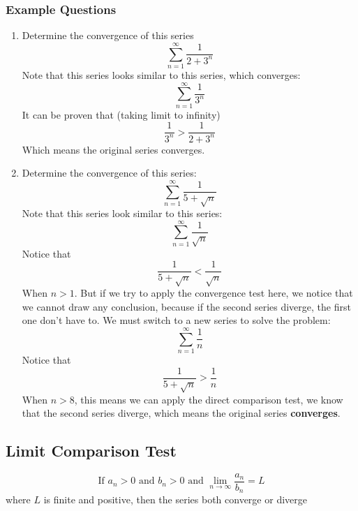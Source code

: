 \documentclass{article}
\numberwithin{equation}{section}
\begin{document}
\subsubsection{Example Questions}
\begin{enumerate}
    \item Determine the convergence of this series
    \[
        \sum_{n = 1}^{\infty} \frac{1}{2 + 3^n}
    \]
    Note that this series looks similar to this series, which converges:
    \[
        \sum_{n = 1}^{\infty} \frac{1}{3^n}
    \]
    It can be proven that (taking limit to infinity)
    \[
        \frac{1}{3^n} > \frac{1}{2 + 3^n}
    \]
    Which means the original series converges.

    \newpage
    \item Determine the convergence of this series:
    \[
        \sum_{n = 1}^{\infty} \frac{1}{5 + \sqrt{n}}
    \]
    Note that this series look similar to this series:
    \[
        \sum_{n = 1}^{\infty} \frac{1}{\sqrt{n}} 
    \]
    Notice that 
    \[
        \frac{1}{5 + \sqrt{n}} < \frac{1}{\sqrt{n}}
    \]
    When $n > 1$. But if we try to apply the convergence test here, we notice that we cannot draw any conclusion,
    because if the second series diverge, the first one don't have to. We must switch to a new series to solve the problem:
    \[
        \sum_{n = 1}^{\infty}\frac{1}{n}
    \]
    Notice that 
    \[
        \frac{1}{5 + \sqrt{n}} > \frac{1}{n}
    \]
    When $n > 8$, this means we can apply the direct comparison test, we know that the second series diverge, 
    which means the original series \textbf{converges}.
\end{enumerate}

\subsection{Limit Comparison Test}

\[
    \text{If } a_n > 0 \text{ and } b_n > 0 \text{ and } \lim_{n\to \infty} \frac{a_n}{b_n} = L 
\]
where $L$ is finite and positive, then the series both converge or diverge
\end{document}
